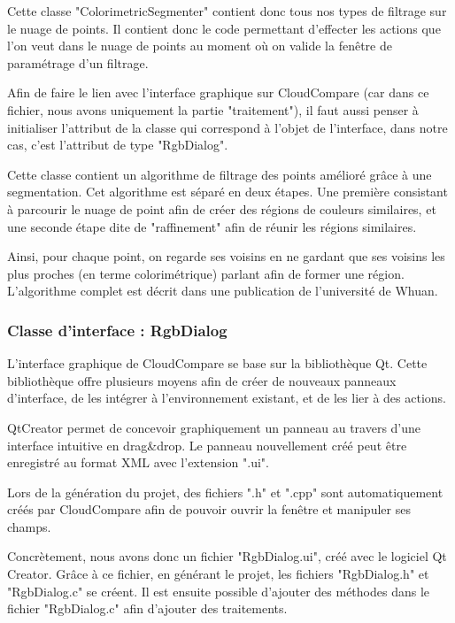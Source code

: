 \documentclass[12pt,titlepage,french]{article}
\begin{document}
Cette classe "ColorimetricSegmenter" contient donc tous nos types de filtrage sur le nuage de points. Il contient donc le code permettant d'effecter les actions que l'on veut dans le nuage de points au moment où on valide la fenêtre de paramétrage d'un filtrage. \newline

Afin de faire le lien avec l'interface graphique sur CloudCompare (car dans ce fichier, nous avons uniquement la partie "traitement"), il faut aussi penser à initialiser l'attribut de la classe qui correspond à l'objet de l'interface, dans notre cas, c'est l'attribut de type "RgbDialog".

Cette classe contient un algorithme de filtrage des points amélioré grâce à une segmentation. Cet algorithme est séparé en deux étapes. Une première consistant à parcourir le nuage de point afin de créer des régions de couleurs similaires, et une seconde étape dite de "raffinement" afin de réunir les régions similaires.

Ainsi, pour chaque point, on regarde ses voisins en ne gardant que ses voisins les plus proches (en terme colorimétrique) parlant afin de former une région. L'algorithme complet est décrit dans une publication de l'université de \cite{B01} Whuan. 

\subsubsection{Classe d'interface : RgbDialog}

L'interface graphique de CloudCompare se base sur la bibliothèque Qt. Cette bibliothèque offre plusieurs moyens afin de créer de nouveaux panneaux d'interface, de les intégrer à l'environnement existant, et de les lier à des actions. \newline

QtCreator permet de concevoir graphiquement un panneau au travers d'une interface intuitive en drag\&drop. Le panneau nouvellement créé peut être enregistré au format XML avec l'extension ".ui". \newline

Lors de la génération du projet, des fichiers ".h" et ".cpp" sont automatiquement créés par CloudCompare afin de pouvoir ouvrir la fenêtre et manipuler ses champs. \newline

Concrètement, nous avons donc un fichier "RgbDialog.ui", créé avec le logiciel Qt Creator. Grâce à ce fichier, en générant le projet, les fichiers "RgbDialog.h" et "RgbDialog.c" se créent. Il est ensuite possible d'ajouter des méthodes dans le fichier "RgbDialog.c" afin d'ajouter des traitements.
\end{document}
